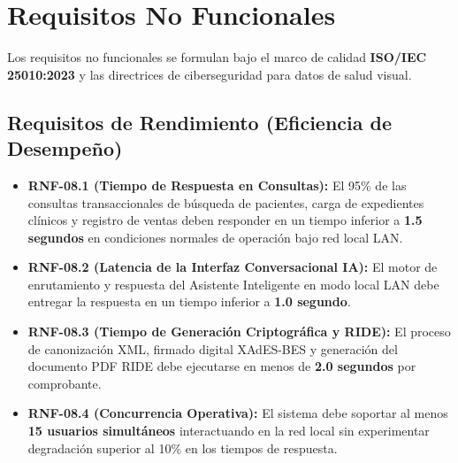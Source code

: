 \documentclass[12pt,a4paper]{report}
\begin{document}
\section{Requisitos No Funcionales}
Los requisitos no funcionales se formulan bajo el marco de calidad \textbf{ISO/IEC 25010:2023} y las directrices de ciberseguridad para datos de salud visual.

\subsection{Requisitos de Rendimiento (Eficiencia de Desempeño)}
\begin{itemize}
    \item \textbf{RNF-08.1 (Tiempo de Respuesta en Consultas):} El 95\% de las consultas transaccionales de búsqueda de pacientes, carga de expedientes clínicos y registro de ventas deben responder en un tiempo inferior a \textbf{1.5 segundos} en condiciones normales de operación bajo red local LAN.
    \item \textbf{RNF-08.2 (Latencia de la Interfaz Conversacional IA):} El motor de enrutamiento y respuesta del Asistente Inteligente en modo local LAN debe entregar la respuesta en un tiempo inferior a \textbf{1.0 segundo}.
    \item \textbf{RNF-08.3 (Tiempo de Generación Criptográfica y RIDE):} El proceso de canonización XML, firmado digital XAdES-BES y generación del documento PDF RIDE debe ejecutarse en menos de \textbf{2.0 segundos} por comprobante.
    \item \textbf{RNF-08.4 (Concurrencia Operativa):} El sistema debe soportar al menos \textbf{15 usuarios simultáneos} interactuando en la red local sin experimentar degradación superior al 10\% en los tiempos de respuesta.
\end{itemize}
\end{document}
